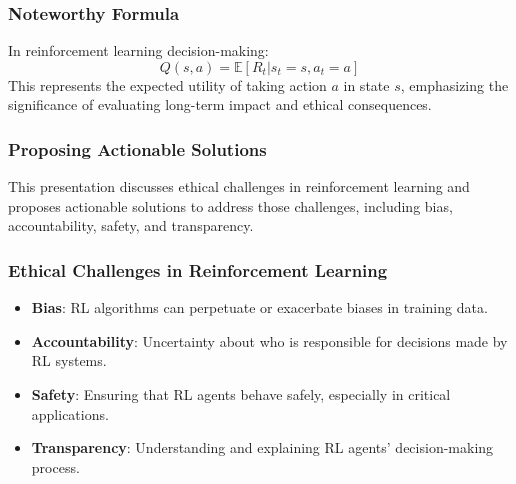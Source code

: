 \documentclass[aspectratio=169]{beamer}
\begin{document}
\begin{frame}[fragile]
    \frametitle{Noteworthy Formula}
    In reinforcement learning decision-making:
    \begin{equation}
    Q(s, a) = \mathbb{E} [R_t | s_t = s, a_t = a]
    \end{equation}
    This represents the expected utility of taking action \( a \) in state \( s \), emphasizing the significance of evaluating long-term impact and ethical consequences.
\end{frame}

\begin{frame}[fragile]
    \frametitle{Proposing Actionable Solutions}
    This presentation discusses ethical challenges in reinforcement learning and proposes actionable solutions to address those challenges, including bias, accountability, safety, and transparency.
\end{frame}

\begin{frame}[fragile]
    \frametitle{Ethical Challenges in Reinforcement Learning}
    \begin{itemize}
        \item \textbf{Bias}: RL algorithms can perpetuate or exacerbate biases in training data.
        \item \textbf{Accountability}: Uncertainty about who is responsible for decisions made by RL systems.
        \item \textbf{Safety}: Ensuring that RL agents behave safely, especially in critical applications.
        \item \textbf{Transparency}: Understanding and explaining RL agents' decision-making process.
    \end{itemize}
\end{frame}
\end{document}

